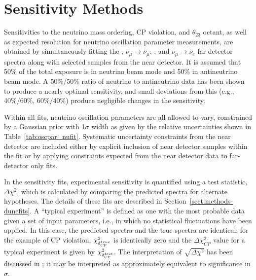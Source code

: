 \section{Sensitivity Methods}
\label{sec:physics-lbnosc-sens}




Sensitivities to the neutrino mass ordering, CP violation, and $\theta_{23}$ octant, as well as expected resolution for neutrino oscillation parameter measurements, are obtained by simultaneously fitting the \numutonumu, $\bar{\nu}_\mu \rightarrow \bar{\nu}_\mu$, \numutonue, and $\bar{\nu}_\mu \rightarrow \bar{\nu}_e$ far detector spectra along with selected samples from the near detector.  It is assumed that 50\% of the total exposure is in neutrino beam mode and 50\% in antineutrino beam mode.  A 50\%/50\% ratio of neutrino to antineutrino data has been shown to produce a nearly optimal sensitivity, and small deviations from this (e.g., 40\%/60\%, 60\%/40\%) produce negligible changes in the sensitivity. %

Within all fits, neutrino oscillation parameters are all allowed to vary, constrained by a Gaussian prior with 1$\sigma$ width as given by the relative uncertainties shown in Table~\ref{tab:oscpar_nufit}. Systematic uncertainty constraints from the near detector are included either by explicit inclusion of near detector samples within the fit or by applying constraints expected from the near detector data to far-detector only fits.

In the sensitivity fits, experimental sensitivity is quantified using a test statistic, $\Delta\chi^2$, which is calculated by comparing the predicted spectra for alternate hypotheses.  The details of these fits are described in Section~\ref{sect:methods-dunefits}. 
A ``typical experiment'' is defined as one with the most probable data given a set of input parameters, i.e., in which no statistical fluctuations have been applied. In this case, the predicted spectra and the true spectra are identical; for the example of CP violation, $\chi^2_{\delta_{\rm CP}^{true}}$ is identically zero and the $\Delta\chi^2_{CP}$ value for a typical experiment is given by $\chi^2_{\delta_{\rm CP}^{test}}$. The interpretation of $\sqrt{\Delta\chi^2}$ has been discussed in \cite{Qian:2012zn,Blennow:2013oma}; it may be interpreted as approximately equivalent to significance in $\sigma$. 

